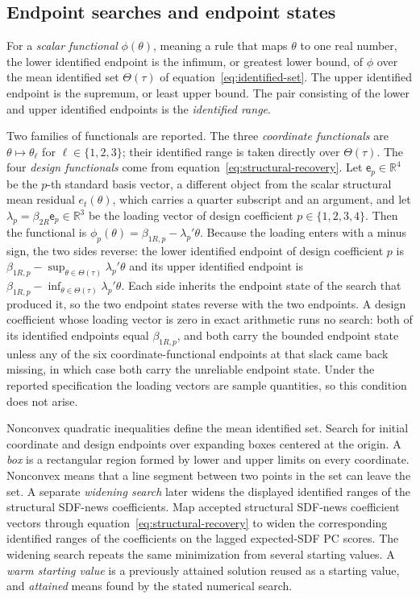 \documentclass[11pt]{article}
\begin{document}
\subsection{Endpoint searches and endpoint states}

For a \emph{scalar functional} \(\phi(\theta)\), meaning a rule that maps \(\theta\) to one real
number, the lower identified endpoint is the infimum, or greatest lower bound, of \(\phi\) over the
mean identified set \(\Theta(\tau)\) of equation~\eqref{eq:identified-set}. The upper identified
endpoint is the supremum, or least upper bound.
The pair consisting of the lower and upper identified endpoints is the \emph{identified range}.

Two families of functionals are reported. The three \emph{coordinate functionals} are
\(\theta\mapsto\theta_\ell\) for \(\ell\in\{1,2,3\}\); their identified range is taken directly over
\(\Theta(\tau)\). The four \emph{design functionals} come from
equation~\eqref{eq:structural-recovery}. Let \(\mathsf e_p\in\mathbb R^4\) be the \(p\)-th standard
basis vector, a different object from the scalar structural mean residual \(e_t(\theta)\), which
carries a quarter subscript and an argument, and let \(\lambda_p=\beta_{2R}\mathsf e_p\in\mathbb R^3\) be the loading vector of design coefficient
\(p\in\{1,2,3,4\}\). Then the functional is \(\phi_p(\theta)=\beta_{1R,p}-\lambda_p'\theta\). Because the
loading enters with a minus sign, the two sides reverse: the lower identified endpoint of design
coefficient \(p\) is \(\beta_{1R,p}-\sup_{\theta\in\Theta(\tau)}\lambda_p'\theta\) and its upper identified
endpoint is \(\beta_{1R,p}-\inf_{\theta\in\Theta(\tau)}\lambda_p'\theta\). Each side inherits the endpoint
state of the search that produced it, so the two endpoint states reverse with the two endpoints. A
design coefficient whose loading vector is zero in exact arithmetic runs no search: both of its
identified endpoints equal \(\beta_{1R,p}\), and both carry the bounded endpoint state unless any of
the six coordinate-functional endpoints at that slack came back missing, in which case both carry the
unreliable endpoint state. Under the reported specification the loading vectors are sample
quantities, so this condition does not arise.

Nonconvex quadratic inequalities define the mean identified set. Search for initial coordinate and
design endpoints over expanding boxes centered at the origin. A \emph{box} is a
rectangular region formed by lower and upper limits on every coordinate. Nonconvex means that a
line segment between two points in the set can leave the set. A separate \emph{widening search}
later widens the displayed identified ranges of the structural SDF-news coefficients. Map accepted
structural SDF-news coefficient vectors through equation~\eqref{eq:structural-recovery} to widen the
corresponding identified ranges of the coefficients on the lagged expected-SDF PC scores. The
widening search repeats the same minimization from several
starting values. A \emph{warm starting value} is a previously attained solution reused as a starting value,
and \emph{attained} means found by the stated numerical search.
\end{document}

